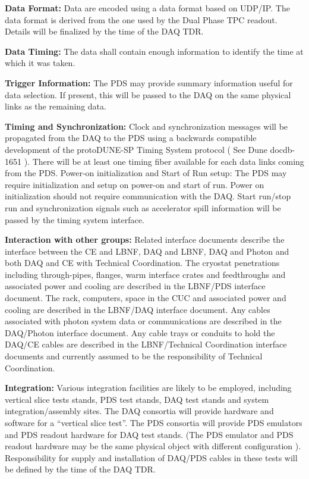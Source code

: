 \textbf{Data Format:} Data are encoded using a data format based on UDP/IP. The data format is derived from the one used by the Dual Phase TPC readout. Details will be finalized by the time of the DAQ TDR.

\textbf{Data Timing:} The data shall contain enough information to identify the time  at which it was taken.

\textbf{Trigger Information:} The PDS may provide summary information useful for data selection. If present, this will be passed to the DAQ on the same physical links as the remaining data.

\textbf{Timing and Synchronization: }Clock and synchronization messages will be propagated from the DAQ to the PDS using a backwards compatible development of the protoDUNE-SP Timing System protocol ( See Dune docdb-1651 ). There will be at least one timing fiber available for each data links coming from the PDS. Power-on initialization and Start of Run setup:  The PDS may require initialization and setup on power-on and start of run. Power on initialization should not require communication with the DAQ. Start run/stop run and synchronization signals such as accelerator spill information will be passed by the timing system interface.

\textbf{Interaction with other groups: }Related interface documents describe the interface between the CE and LBNF, DAQ and LBNF, DAQ and Photon and both DAQ and CE with Technical Coordination. The cryostat penetrations including through-pipes, flanges, warm interface crates and feedthroughs and associated power and cooling are described in the LBNF/PDS interface document.  The rack, computers, space in the CUC and associated power and cooling are described in the LBNF/DAQ interface document. Any cables associated with photon system data or communications are described in the DAQ/Photon interface document. Any cable trays or conduits to hold the DAQ/CE cables are described in the LBNF/Technical Coordination interface documents and currently assumed to be the responsibility of Technical Coordination.

\textbf{Integration:} Various integration facilities are likely to be employed, including vertical slice tests stands, PDS test stands, DAQ test stands and system integration/assembly sites. The DAQ consortia will provide hardware and software for a “vertical slice test”. The PDS consortia will provide PDS emulators and PDS readout hardware for DAQ test stands. (The PDS emulator and PDS readout hardware may be the same physical object with different configuration ). Responsibility for supply and installation of DAQ/PDS cables in these tests will be defined by the time of the DAQ TDR.



